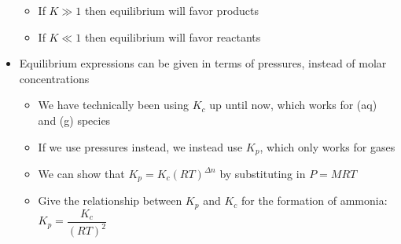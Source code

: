 \documentclass[12pt, openany, letterpaper]{memoir}
\begin{document}
\begin{itemize}
	\begin{itemize}
		\item If $K \gg 1$ then equilibrium will favor products
		\item If $K \ll 1$ then equilibrium will favor reactants
	\end{itemize}
	\item Equilibrium expressions can be given in terms of pressures, instead of molar concentrations
	\begin{itemize}
		\item We have technically been using $K_c$ up until now, which works for (aq) and (g) species
		\item If we use pressures instead, we instead use $K_p$, which only works for gases
		\item We can show that $K_p = K_c\left(RT\right)^{\Delta n}$ by substituting in $P=MRT$
		\item Give the relationship between $K_p$ and $K_c$ for the formation of ammonia: $K_p = \dfrac{K_c}{\left(RT\right)^2}$
	\end{itemize}
\end{itemize}
\end{document}
